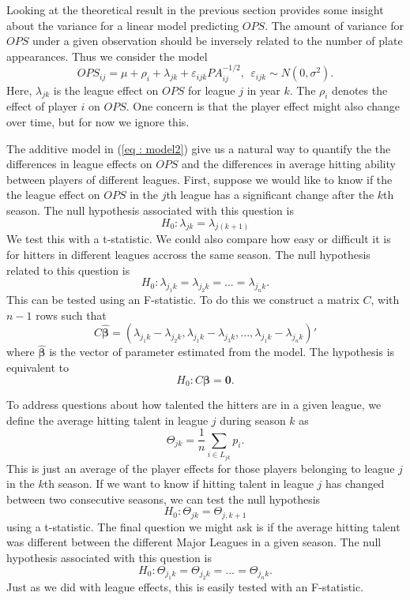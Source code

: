 \documentclass [52pt] {article}
\begin{document}
Looking at the theoretical result in the previous section provides some insight about the variance for a linear model predicting $OPS$.  The amount of variance for $OPS$ under a given observation should be inversely related to the number of plate appearances.  Thus we consider the model
\begin{equation}\label{eq : model2}
OPS_{ij} = \mu+\rho_i+\lambda_{jk} +\varepsilon_{ijk}PA_{ij}^{-1/2}, \:\:\varepsilon_{ijk}\sim N(0, \sigma^2).
\end{equation}
Here, $\lambda_{jk}$ is the league effect on $OPS$ for league $j$ in year $k$.  The $\rho_i$ denotes the effect of player $i$ on $OPS$. One concern is that the player effect might also change over time, but for now we ignore this.  

The additive model in (\ref{eq : model2}) give us a natural way to quantify the the differences in league effects on $OPS$ and the differences in average hitting ability between players of different leagues.  First, suppose we would like to know if the the league effect on $OPS$ in the $j$th league has a significant change after the $k$th season.  The null hypothesis associated with this question is 
\[H_0: \lambda_{jk} = \lambda_{j(k+1)}\]
We test this with a t-statistic.  We could also compare how easy or difficult it is for hitters in different leagues accross the same season.  The null hypothesis related to this question is 
\[H_0: \lambda_{j_1k} = \lambda_{j_2k} = ...= \lambda_{j_nk}.\]
This can be tested using an F-statistic.  To do this we construct a matrix $C$, with $n - 1$ rows such that 
\[C\hat{\pmb{\beta}} = (\lambda_{j_1k}-\lambda_{j_2k},\lambda_{j_1k}-\lambda_{j_3k}, ..., \lambda_{j_1k}-\lambda_{j_nk})'\] 
where $\hat{\pmb{\beta}}$ is the vector of parameter estimated from the model.  The hypothesis is equivalent to 
\[H_0:C\pmb\beta = \mathbf{0}.\]

To address questions about how talented the hitters are in a given league, we define the average hitting talent in league $j$ during season $k$ as
\[\Theta_{jk} = \frac{1}{n}\sum_{i\in L_{jk}} p_i.\]
This is just an average of the player effects for those players belonging to league $j$ in the $k$th season.  If we want to know if hitting talent in league $j$ has changed between two consecutive seasons, we can test the null hypothesis
\[H_0: \Theta_{jk} = \Theta_{j,k+1}\]
using a t-statistic.  The final question we might ask is if the average hitting talent was different between the different Major Leagues in a given season.  The null hypothesis associated with this question is 
\[H_0: \Theta_{j_1k} = \Theta_{j_2k} = ...= \Theta_{j_nk}.\]
Just as we did with league effects, this is easily tested with an F-statistic. 
\end{document}

